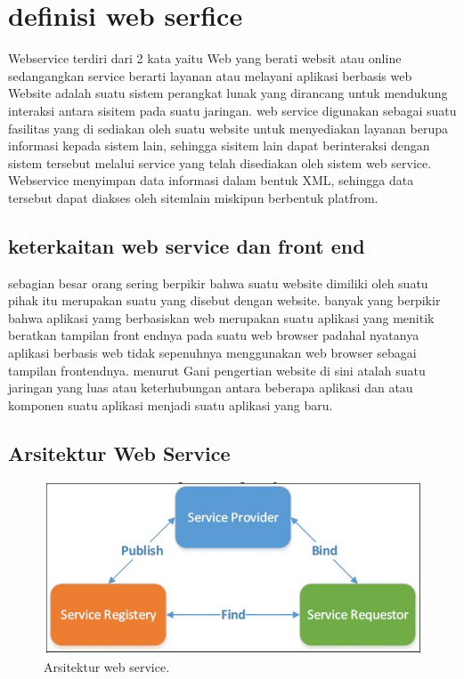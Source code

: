 \section{definisi web serfice }
Webservice terdiri dari 2 kata yaitu Web yang berati websit atau online 
sedangangkan service berarti layanan atau melayani aplikasi berbasis web 
Website adalah suatu sistem perangkat lunak yang dirancang untuk mendukung interaksi antara sisitem pada suatu jaringan.
web service digunakan sebagai suatu fasilitas yang di sediakan oleh suatu website untuk menyediakan layanan berupa informasi kepada 
sistem lain, sehingga sisitem lain dapat berinteraksi dengan sistem tersebut melalui service yang telah disediakan oleh sistem web service.
Webservice menyimpan data informasi dalam bentuk XML, sehingga data tersebut dapat diakses oleh sitemlain miskipun berbentuk platfrom. 
\subsection{keterkaitan web service dan front end }
sebagian besar orang sering berpikir bahwa suatu website dimiliki oleh suatu pihak 
itu merupakan suatu yang disebut dengan website. banyak yang berpikir bahwa aplikasi yamg berbasiskan 
web merupakan suatu aplikasi yang menitik beratkan tampilan front endnya pada suatu web browser 
padahal nyatanya aplikasi berbasis web tidak sepenuhnya menggunakan web browser sebagai tampilan 
frontendnya. menurut Gani pengertian website di sini atalah suatu jaringan yang luas atau keterhubungan 
antara beberapa aplikasi dan atau komponen suatu aplikasi menjadi suatu aplikasi yang baru.

\subsection{Arsitektur Web Service}
\begin{figure}[ht]
\centerline{\includegraphics[width=1\textwidth]{figures/1arsitektur.JPG}}

\caption{Arsitektur web service.} 
\label{1arsitektur}
\end{figure}

